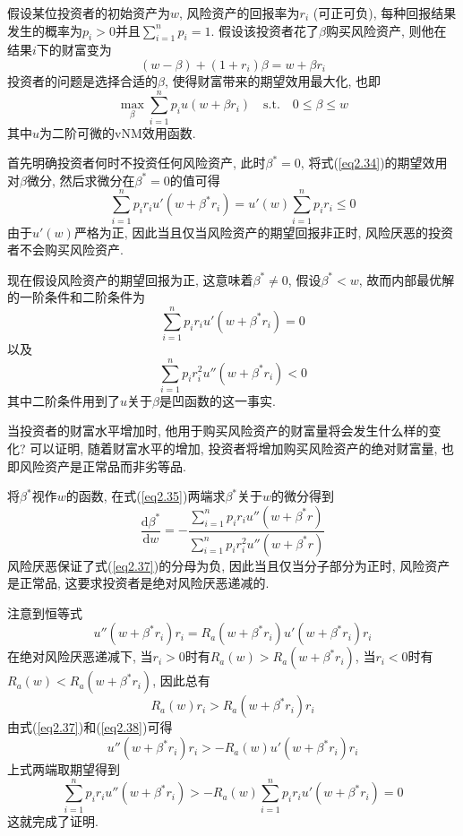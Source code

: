 \documentclass[cn, 12pt, math=mtpro2, bibstyle=apa, blue]{elegantbook}
\begin{document}
\begin{example}
假设某位投资者的初始资产为$w$, 风险资产的回报率为$r_i$ (可正可负), 每种回报结果发生的概率为$p_i>0$并且$\sum_{i=1}^{n}p_i=1$. 假设该投资者花了$\beta$购买风险资产, 则他在结果$i$下的财富变为
$$(w-\beta)+(1+r_i)\beta=w+\beta r_i$$
投资者的问题是选择合适的$\beta$, 使得财富带来的期望效用最大化, 也即
\begin{equation}\label{eq2.34}
  \max_\beta \sum_{i=1}^{n}p_iu(w+\beta r_i)\quad \text{s.t.}\quad 0\leq \beta\leq w
\end{equation}
其中$u$为二阶可微的vNM效用函数.

首先明确投资者何时不投资任何风险资产, 此时$\beta^\ast=0$, 将式(\ref{eq2.34})的期望效用对$\beta$微分, 然后求微分在$\beta^\ast=0$的值可得
$$\sum_{i=1}^{n}p_ir_iu'(w+\beta^\ast r_i)=u'(w)\sum_{i=1}^{n}p_ir_i\leq 0$$
由于$u'(w)$严格为正, 因此当且仅当风险资产的期望回报非正时, 风险厌恶的投资者不会购买风险资产.

现在假设风险资产的期望回报为正, 这意味着$\beta^\ast\neq 0$, 假设$\beta^\ast<w$, 故而内部最优解的一阶条件和二阶条件为
\begin{equation}\label{eq2.35}
  \sum_{i=1}^{n}p_ir_iu'(w+\beta^\ast r_i)=0
\end{equation}
以及
\begin{equation}\label{eq2.36}
\sum_{i=1}^{n}p_ir_i^2u''(w+\beta^\ast r_i)<0
\end{equation}
其中二阶条件用到了$u$关于$\beta$是凹函数的这一事实.

当投资者的财富水平增加时, 他用于购买风险资产的财富量将会发生什么样的变化? 可以证明, 随着财富水平的增加, 投资者将增加购买风险资产的绝对财富量, 也即风险资产是正常品而非劣等品.

将$\beta^\ast$视作$w$的函数, 在式(\ref{eq2.35})两端求$\beta^\ast$关于$w$的微分得到
\begin{equation}\label{eq2.37}
  \frac{\text{d}\beta^\ast}{\text{d}w}=-\frac{\sum_{i=1}^{n}p_ir_iu''(w+\beta^\ast r)}{\sum_{i=1}^{n}p_ir_i^2u''(w+\beta^\ast r)}
\end{equation}
风险厌恶保证了式(\ref{eq2.37})的分母为负, 因此当且仅当分子部分为正时, 风险资产是正常品, 这要求投资者是绝对风险厌恶递减的.

注意到恒等式
$$u''(w+\beta^\ast r_i)r_i=R_a(w+\beta^\ast r_i)u'(w+\beta^\ast r_i)r_i$$
在绝对风险厌恶递减下, 当$r_i>0$时有$R_a(w)>R_a(w+\beta^\ast r_i)$, 当$r_i<0$时有$R_a(w)<R_a(w+\beta^\ast r_i)$, 因此总有
\begin{equation}\label{eq2.38}
  R_a(w)r_i>R_a(w+\beta^\ast r_i)r_i
\end{equation}
由式(\ref{eq2.37})和(\ref{eq2.38})可得
$$u''(w+\beta^\ast r_i)r_i>-R_a(w)u'(w+\beta^\ast r_i)r_i$$
上式两端取期望得到
$$\sum_{i=1}^{n}p_ir_iu''(w+\beta^\ast r_i)>-R_a(w)\sum_{i=1}^{n}p_ir_iu'(w+\beta^\ast r_i)=0$$
这就完成了证明.

\end{example}
\end{document}

